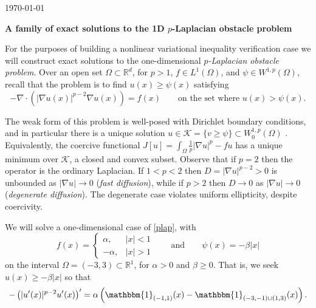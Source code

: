 \documentclass[11pt]{amsart}
\newcommand{\Div}{\ensuremath{\nabla\cdot}}
\newcommand{\grad}{\nabla}
\newcommand{\RR}{\mathbb{R}}
\begin{document}
\scriptsize \hfill \today

\Large
\bigskip
\centerline{\textbf{A family of exact solutions to the 1D $p$-Laplacian obstacle problem}}
\bigskip

\normalsize

\thispagestyle{empty}

For the purposes of building a nonlinear variational inequality verification case we will construct exact solutions to the one-dimensional \emph{$p$-Laplacian obstacle problem}.  Over an open set $\Omega\subset \RR^d$, for $p>1$, $f \in L^1(\Omega)$, and $\psi \in W^{1,p}(\Omega)$, recall that the problem is to find $u(x) \ge \psi(x)$ satisfying
\begin{equation}
-\Div\left(|\grad u(x)|^{p-2} \grad u(x)\right) = f(x) \qquad \text{on the set where } u(x) > \psi(x). \label{plap}
\end{equation}

The weak form of this problem is well-posed with Dirichlet boundary conditions, and in particular there is a unique solution $u \in \mathcal{K}=\{v \ge \psi\} \subset W_0^{1,p}(\Omega)$ \cite{KinderlehrerStampacchia1980}.  Equivalently, the coercive functional $J[u] = \int_\Omega \frac{1}{p} |\grad u|^p - f u$ has a unique minimum over $\mathcal{K}$, a closed and convex subset.  Observe that if $p=2$ then the operator is the ordinary Laplacian.  If $1<p<2$ then $D=|\grad u|^{p-2}>0$ is unbounded as $|\grad u| \to 0$ (\emph{fast diffusion}), while if $p>2$ then $D\to 0$ as $|\grad u| \to 0$ (\emph{degenerate diffusion}).  The degenerate case violates uniform ellipticity, despite coercivity.

We will solve a one-dimensional case of \eqref{plap}, with
\begin{equation}
f(x) = \begin{cases} \alpha, & |x| < 1 \\ -\alpha, & |x| > 1\end{cases} \qquad \text{and} \qquad \psi(x) = - \beta |x| \label{data}
\end{equation}
on the interval $\Omega = (-3,3) \subset \RR^1$, for $\alpha > 0$ and $\beta \ge 0$.
That is, we seek $u(x) \ge -\beta |x|$ so that
\begin{equation}
-\left(|u'(x)|^{p-2} u'(x)\right)' = \alpha \left(\mathbbm{1}_{(-1,1)}(x) - \mathbbm{1}_{(-3,-1)\cup(1,3)}(x)\right).  \label{concrete}
\end{equation}
\end{document}
